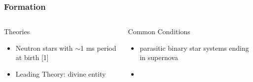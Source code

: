 \documentclass[hyperref=pdftex, presentation]{beamer}
\begin{document}
\begin{frame}{}
\frametitle{\Large Formation}
\begin{columns}[c] %

\begin{block}{Theories}
\begin{itemize}
 \item<2-> Neutron stars with $\sim$1 ms period at birth [1]%
 \item<4-> Leading Theory: divine entity
\end{itemize}
\end{block}
\begin{block}{Common Conditions}
\begin{itemize}
	\item<3-> parasitic binary star systems ending in supernova %
	\item<5-> 
\end{itemize}
\end{block}


\end{columns}
\end{frame}






\end{document}
